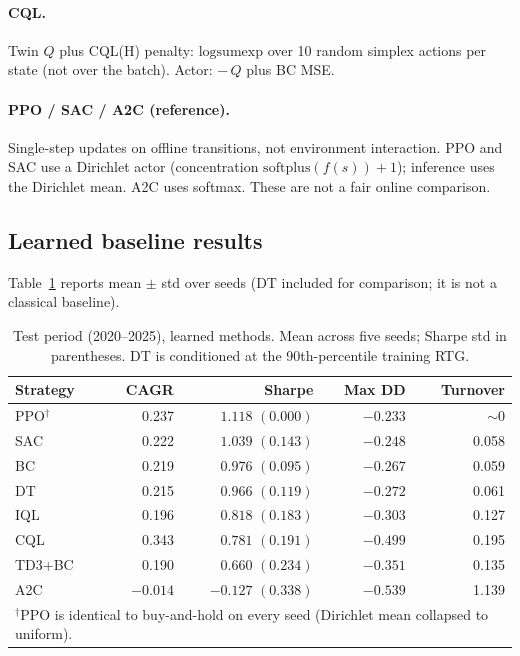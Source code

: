 \documentclass[11pt]{article}
\begin{document}
\paragraph{CQL.}
Twin $Q$ plus CQL(H) penalty: $\mathrm{logsumexp}$ over 10 random simplex actions per state (not over the batch). Actor: $-\,Q$ plus BC MSE.

\paragraph{PPO / SAC / A2C (reference).}
Single-step updates on offline transitions, not environment interaction. PPO and SAC use a Dirichlet actor (concentration $\mathrm{softplus}(f(s))+1$); inference uses the Dirichlet mean. A2C uses softmax. These are not a fair online comparison.

\subsection{Learned baseline results}
Table~\ref{tab:learned} reports mean $\pm$ std over seeds (DT included for comparison; it is not a classical baseline).

\begin{table}[h]
\centering
\caption{Test period (2020--2025), learned methods. Mean across five seeds; Sharpe std in parentheses. DT is conditioned at the 90th-percentile training RTG.}
\label{tab:learned}
\begin{tabular}{lrrrr}
\toprule
Strategy & CAGR & Sharpe & Max DD & Turnover \\
\midrule
PPO$^\dagger$ & 0.237 & $1.118$ $(0.000)$ & $-0.233$ & $\sim 0$ \\
SAC           & 0.222 & $1.039$ $(0.143)$ & $-0.248$ & 0.058 \\
BC            & 0.219 & $0.976$ $(0.095)$ & $-0.267$ & 0.059 \\
DT            & 0.215 & $0.966$ $(0.119)$ & $-0.272$ & 0.061 \\
IQL           & 0.196 & $0.818$ $(0.183)$ & $-0.303$ & 0.127 \\
CQL           & 0.343 & $0.781$ $(0.191)$ & $-0.499$ & 0.195 \\
TD3+BC        & 0.190 & $0.660$ $(0.234)$ & $-0.351$ & 0.135 \\
A2C           & $-0.014$ & $-0.127$ $(0.338)$ & $-0.539$ & 1.139 \\
\bottomrule
\multicolumn{5}{l}{\footnotesize $^\dagger$PPO is identical to buy-and-hold on every seed (Dirichlet mean collapsed to uniform).}
\end{tabular}
\end{table}
\end{document}
